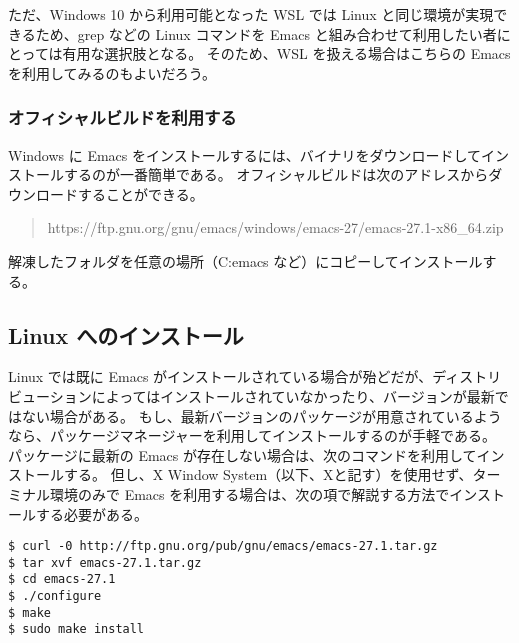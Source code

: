 ただ、Windows 10 から利用可能となった WSL では Linux と同じ環境が実現できるため、grep などの Linux コマンドを Emacs と組み合わせて利用したい者にとっては有用な選択肢となる。
そのため、WSL を扱える場合はこちらの Emacs を利用してみるのもよいだろう。
\subsubsection{オフィシャルビルドを利用する}
Windows に Emacs をインストールするには、バイナリをダウンロードしてインストールするのが一番簡単である。
オフィシャルビルドは次のアドレスからダウンロードすることができる。
\begin{quote}
  https://ftp.gnu.org/gnu/emacs/windows/emacs-27/emacs-27.1-x86\_64.zip
\end{quote}
解凍したフォルダを任意の場所（C:\textyen{}emacs など）にコピーしてインストールする。
\subsection{Linux へのインストール}
Linux では既に Emacs がインストールされている場合が殆どだが、ディストリビューションによってはインストールされていなかったり、バージョンが最新ではない場合がある。
もし、最新バージョンのパッケージが用意されているようなら、パッケージマネージャーを利用してインストールするのが手軽である。\\

パッケージに最新の Emacs が存在しない場合は、次のコマンドを利用してインストールする。
但し、X Window System（以下、Xと記す）を使用せず、ターミナル環境のみで Emacs を利用する場合は、次の項で解説する方法でインストールする必要がある。
\begin{mdframed}[roundcorner=0.50zw,leftmargin=3.00zw,rightmargin=3.00zw,skipabove=0.40zw,skipbelow=0.40zw,innertopmargin=4.00pt,innerbottommargin=4.00pt,innerleftmargin=5.00pt,innerrightmargin=5.00pt,linecolor=gray!090,linewidth=0.50pt,backgroundcolor=gray!90]\color{gray!10}
\begin{verbatim}
$ curl -0 http://ftp.gnu.org/pub/gnu/emacs/emacs-27.1.tar.gz
$ tar xvf emacs-27.1.tar.gz
$ cd emacs-27.1
$ ./configure
$ make
$ sudo make install
\end{verbatim}
\end{mdframed}
